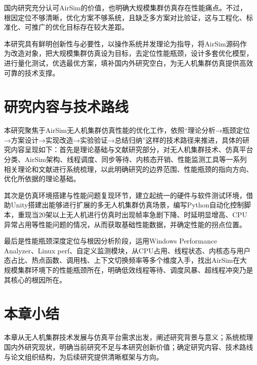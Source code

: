 国内研究充分认可AirSim的价值，也明确大规模集群仿真存在性能痛点。不过，根因定位不够清晰，优化方案不够系统，且缺乏多方案对比验证，这与工程化、标准化、可推广的优化目标存在较大差距。

本研究具有鲜明创新性与必要性，以操作系统并发理论为指导，将AirSim源码作为改造对象，把大规模集群仿真设为目标，去定位性能瓶颈，设计多套优化模型，进行量化测试，优选最优方案，填补国内外研究空白，为无人机集群仿真提供高效可靠的技术支撑。

\section{研究内容与技术路线}

本研究聚焦于AirSim无人机集群仿真性能的优化工作，依照``理论分析→瓶颈定位→方案设计→实现改造→实验验证→总结归纳''这样的技术路径来推进，具体的研究内容呈现如下：首先是理论基础与文献研究部分，对无人机集群技术、仿真平台分类、AirSim架构、线程调度、同步等待、内核态开销、性能监测工具等一系列相关理论和文献进行系统梳理，以此明确研究的边界范围、性能瓶颈的指向方向、优化所依据的理论基础。

其次是仿真环境搭建与性能问题复现环节，建立起统一的硬件与软件测试环境，借助Unity搭建出能够进行扩展的多无人机集群仿真场景，编写Python自动化控制脚本，重现当20架以上无人机进行仿真时出现帧率急剧下降、时延明显增高、CPU异常占用等性能问题的情况，从而获取基础性能数据，并确定性能的拐点位置。

最后是性能瓶颈深度定位与根因分析阶段，运用Windows Performance
Analyzer、Linux
perf、自定义监测模块，从CPU占用、线程状态、内核态与用户态占比、热点函数、调用栈、上下文切换频率等多个维度入手，找出AirSim在大规模集群环境下的性能瓶颈所在，明确低效线程等待、调度风暴、超线程冲突乃是其核心的根因所在。

\section{本章小结}

本章从无人机集群技术发展与仿真平台需求出发，阐述研究背景与意义；系统梳理国内外研究现状，明确当前研究不足与本研究创新价值；确定研究内容、技术路线与论文组织结构，为后续研究提供清晰框架与方向。
